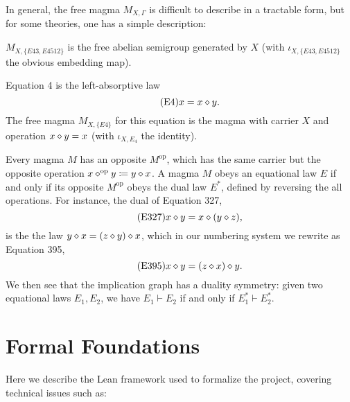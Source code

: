 In general, the free magma $M_{X,\Gamma}$ is difficult to describe in a tractable form, but for some theories, one has a simple description:

\begin{example}  $M_{X,\{E43, E4512\}}$ is the free abelian semigroup generated by $X$ (with $\iota_{X,\{E43,E4512\}}$ the obvious embedding map).
\end{example}

\begin{example}\label{left-absorb}  Equation 4 is the left-absorptive law
    \begin{equation}\label{eq4}\tag{E4}
       x = x \diamond y.
    \end{equation}
The free magma $M_{X,\{E4\}}$ for this equation is the magma with carrier $X$ and operation $x \diamond y = x$ (with $\iota_{X,E_4}$ the identity).
\end{example}


Every magma $M$ has an opposite $M^{\mathrm{op}}$, which has the same carrier but the opposite operation $x \diamond^{\mathrm{op}} y \coloneqq y \diamond x$.  A magma $M$ obeys an equational law $E$ if and only if its opposite $M^{\mathrm{op}}$ obeys the dual law $E^*$, defined by reversing the all operations.  For instance, the dual of Equation 327,
\begin{equation}\label{eq327}\tag{E327}
    x \diamond y = x \diamond (y \diamond z),
\end{equation}
is the the law $y \diamond x = (z \diamond y) \diamond x$, which in our numbering system we rewrite as Equation 395,
\begin{equation}\label{eq395}\tag{E395}
    x \diamond y = (z \diamond x) \diamond y.
\end{equation}
We then see that the implication graph has a duality symmetry: given two equational laws $E_1,E_2$, we have $E_1 \vdash E_2$ if and only if $E_1^* \vdash E_2^*$.

\section{Formal Foundations}


Here we describe the Lean framework used to formalize the project, covering technical issues such as:

